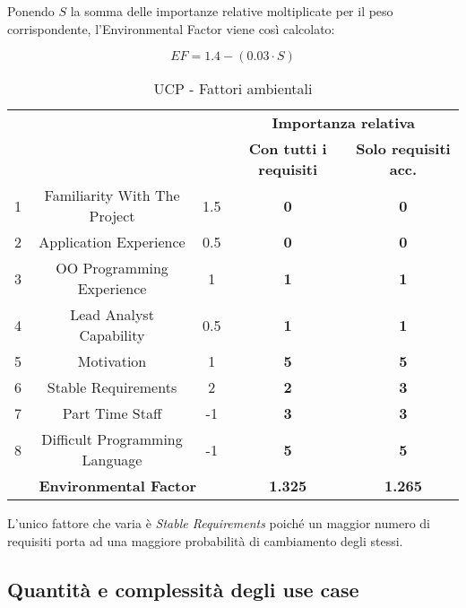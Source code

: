 Ponendo $S$ la somma delle importanze relative moltiplicate per il peso corrispondente, l'Environmental Factor viene così calcolato:

\[
EF=1.4-(0.03 \cdot S)
\]

\begin{table}[H]
\begin{adjustwidth}{-4cm}{-4cm}
	\begin{center}
		\begin{tabular}{|c|c|c|c|c|}
			\hline
			\multicolumn{ 2}{|c|}{\raisebox{-1\height}{\textbf{Fattori ambientali}}} & \multicolumn{ 1}{c|}{\raisebox{-1\height}{\textbf{Peso}}} & \multicolumn{ 2}{c|}{\textbf{Importanza relativa}} \\ \cline{ 4- 5}
			\multicolumn{ 2}{|c|}{\textbf{}} & \multicolumn{ 1}{c|}{} & \textbf{Con tutti i requisiti} & \textbf{Solo requisiti acc.} \\ \hline
			1 & Familiarity With The Project & 1.5 & \textbf{0} & \textbf{0} \\ \hline
			2 & Application Experience & 0.5 & \textbf{0} & \textbf{0} \\ \hline
			3 & OO Programming Experience & 1 & \textbf{1} & \textbf{1} \\ \hline
			4 & Lead Analyst Capability & 0.5 & \textbf{1} & \textbf{1} \\ \hline
			5 & Motivation & 1 & \textbf{5} & \textbf{5} \\ \hline
			6 & Stable Requirements & 2 & \textbf{2} & \textbf{3} \\ \hline
			7 & Part Time Staff & -1 & \textbf{3} & \textbf{3} \\ \hline
			8 & Difficult Programming Language & -1 & \textbf{5} & \textbf{5} \\ \hline
			\multicolumn{ 3}{|c|}{\textbf{Environmental Factor}} & \textbf{1.325} & \textbf{1.265} \\ \hline
		\end{tabular}
	\end{center}
\caption{UCP - Fattori ambientali}
\end{adjustwidth}
\end{table}

L'unico fattore che varia è \emph{Stable Requirements} poiché un maggior numero di requisiti porta ad una maggiore probabilità di cambiamento degli stessi.


\subsection{Quantità e complessità degli use case}

